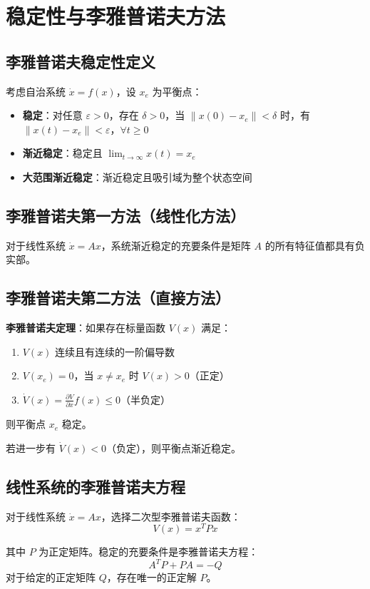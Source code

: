 \documentclass[12pt,a4paper]{article}
\begin{document}
\section{稳定性与李雅普诺夫方法}

\subsection{李雅普诺夫稳定性定义}
考虑自治系统 $\dot{x} = f(x)$，设 $x_e$ 为平衡点：
\begin{itemize}
    \item \textbf{稳定}：对任意 $\varepsilon > 0$，存在 $\delta > 0$，当 $\|x(0) - x_e\| < \delta$ 时，有 $\|x(t) - x_e\| < \varepsilon$，$\forall t \geq 0$
    \item \textbf{渐近稳定}：稳定且 $\lim_{t \to \infty} x(t) = x_e$
    \item \textbf{大范围渐近稳定}：渐近稳定且吸引域为整个状态空间
\end{itemize}

\subsection{李雅普诺夫第一方法（线性化方法）}
对于线性系统 $\dot{x} = Ax$，系统渐近稳定的充要条件是矩阵 $A$ 的所有特征值都具有负实部。

\subsection{李雅普诺夫第二方法（直接方法）}
\textbf{李雅普诺夫定理}：如果存在标量函数 $V(x)$ 满足：
\begin{enumerate}
    \item $V(x)$ 连续且有连续的一阶偏导数
    \item $V(x_e) = 0$，当 $x \neq x_e$ 时 $V(x) > 0$（正定）
    \item $\dot{V}(x) = \frac{\partial V}{\partial x} f(x) \leq 0$（半负定）
\end{enumerate}
则平衡点 $x_e$ 稳定。

若进一步有 $\dot{V}(x) < 0$（负定），则平衡点渐近稳定。

\subsection{线性系统的李雅普诺夫方程}
对于线性系统 $\dot{x} = Ax$，选择二次型李雅普诺夫函数：
\[V(x) = x^T P x\]

其中 $P$ 为正定矩阵。稳定的充要条件是李雅普诺夫方程：
\[A^T P + PA = -Q\]
对于给定的正定矩阵 $Q$，存在唯一的正定解 $P$。
\end{document}
